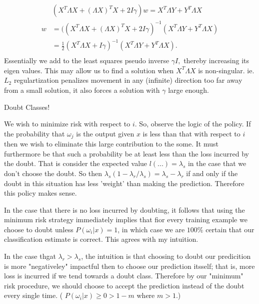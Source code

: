 \documentclass[letter]{article}
\newenvironment{menumerate}{%
  \edef\backupindent{\the\parindent}%
  \enumerate%
  \setlength{\parindent}{\backupindent}%
}{\endenumerate}
\begin{document}
\begin{menumerate}
\begin{menumerate}
    \begin{equation}
      \begin{aligned}
          &(X^T \Lambda X + (\Lambda X)^T X + 2I\gamma)w  =  X^T \Lambda Y  + Y^T\Lambda X \\
          w  &=  ((X^T \Lambda X + (\Lambda X)^T X + 2I\gamma)^{-1}(X^T \Lambda Y  + Y^T\Lambda X) \\
          &=  \frac12(X^T\Lambda X + I\gamma)^{-1}(X^T \Lambda Y  + Y^T\Lambda X) .\\
      \end{aligned}
    \end{equation}
    Essentially we add to the least squares pseudo inverse $\gamma I,$ thereby increasing its eigen values.
    This may allow us to find a solution when $X^T\Lambda X$ is non-singular. ie. $L_2$ regulartization penalizes
    movement in any (infinite) direction too far away from a small solution, it also forces a solution with $\gamma$ large enough.
  \end{menumerate}
  \newpage
  \item Doubt Classes!
  \begin{menumerate}
    \item We wish to minimize risk with respect to $i$. So, 
    observe the logic of the policy. If the probability that $\omega_j$ is the output
    given $x$ is less than that with respect to $i$ then we wish to eliminate this large contribution to the some.
    It must furthermore be that such a probability be at least less than the loss incurred
    by the doubt. That is consider the expected value $l(...) = \lambda_s$ in the case that we don't 
    choose the doubt. So then $\lambda_s(1-\lambda_r/\lambda_s) = \lambda_s - \lambda_r$ if
    and only if the doubt in this situation has less 'weight' than making the prediction. 
    Therefore this policy makes sense.
    \item In the case that there is no loss incurred by doubting,
    it follows that using the minimum risk strategy immediately implies
    that fior every training example we choose to doubt unless
    $P(\omega_i|x) = 1$, in which case we are $100\%$ certain
    that our classification estimate is correct. This agrees with my intuition.

    In the case thgat $\lambda_r > \lambda_s$, the intuition is that choosing to
    doubt our predicition is more "negativeley" impactful then to choose our prediction
    itsself; that is, more loss is incurred if we tend towards a doubt class.
    Therefore by our "minimum" risk procedure, we should choose to accept the prediction
    instead of the doubt every single time. ( $P(\omega_i|x) \geq 0 > 1 - m $ where $m > 1$.)
  \end{menumerate}
\end{menumerate}
\end{document}
